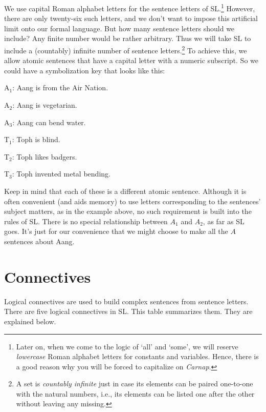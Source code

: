 We use capital Roman alphabet letters for the sentence letters of SL.\footnote{Later on, when we come to the logic of `all' and `some', we will reserve \textit{lowercase} Roman alphabet letters for constants and variables. Hence, there is a good reason why you will be forced to capitalize on \textit{Carnap}.} 
However, there are only twenty-six such letters, and we don't want to impose this artificial limit onto our formal language.
But how many sentence letters should we include?
Any finite number would be rather arbitrary.
Thus we will take SL to include a (countably) infinite number of sentence letters.\footnote{A set is \textit{countably infinite} just in case its elements can be paired one-to-one with the natural numbers, i.e., its elements can be listed one after the other without leaving any missing.}
To achieve this, we allow atomic sentences that have a capital letter with a numeric subscript.
So we could have a symbolization key that looks like this:

\begin{ekey}
\item[A$_1$:] Aang is from the Air Nation.
\item[A$_2$:] Aang is vegetarian.
\item[A$_3$:] Aang can bend water.
\item[T$_1$:] Toph is blind.
\item[T$_2$:] Toph likes badgers.
\item[T$_3$:] Toph invented metal bending.
\end{ekey}

Keep in mind that each of these is a different atomic sentence.
Although it is often convenient (and aids memory) to use letters corresponding to the sentences' subject matters, as in the example above, no such requirement is built into the rules of SL.
There is no special relationship between $A_{1}$ and $A_{2}$, as far as SL goes.
It's just for our convenience that we might choose to make all the $A$ sentences about Aang.




\section{Connectives}

Logical connectives are used to build complex sentences from sentence letters.
There are five logical connectives in SL.
This table summarizes them.
They are explained below.


